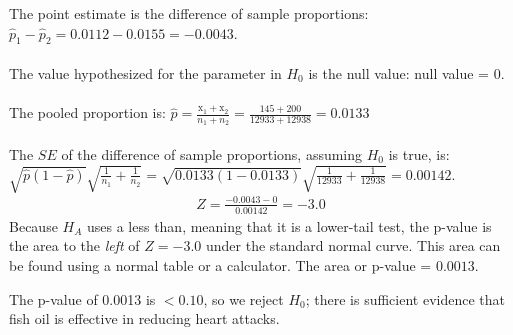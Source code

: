 \begin{examplewrap}
\begin{nexample}
\begin{description}
The point estimate is the difference of sample proportions: $\hat{p}_1-\hat{p}_2 = 0.0112 - 0.0155 = -0.0043.$\\
\\
The value hypothesized for the parameter in $H_0$ is the null value:  null value = 0.\\
\\
The pooled proportion is: $\hat{p} = \frac{\text{x}_1+\text{x}_2}{n_1+n_2}=\frac{145 + 200}{12933 + 12938}=0.0133$
\\
\\
The $SE$ of the difference of sample proportions, assuming $H_0$ is true, is:  $\sqrt{\hat{p}(1-\hat{p})}\sqrt{\frac{1}{n_1} + \frac{1}{n_2}} = \sqrt{0.0133(1-0.0133)}\sqrt{\frac{1}{12933} + \frac{1}{12938}}=0.00142$. \\
\begin{align*}
Z = \frac{-0.0043 - 0}{0.00142} = -3.0
\end{align*}
Because $H_A$ uses a less than, meaning that it is a lower-tail test, the \mbox{p-value} is the area to the \emph{left} of $Z=-3.0$ under the standard normal curve.  This area can be found using a normal table or a calculator.  The area or p-value = $0.0013$.  
\item[\inferencestep{Conclude}]  The p-value of 0.0013 is $< 0.10$, so we reject $H_0$; there is sufficient evidence that fish oil is effective in reducing heart attacks.  
\end{description}
\end{nexample}
\end{examplewrap}


\D{\newpage}

